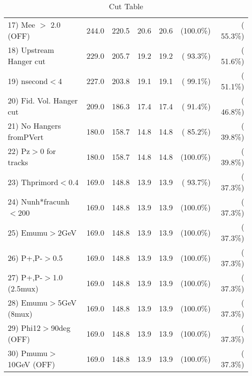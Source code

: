 \begin{table}[h!]
\begin{tabular}{||l||r|r|r|r|r|r||}
 17) Mee $>$ 2.0  (OFF)   &        244.0 &        220.5 &         20.6 &         20.6 & (100.0\%) & ( 55.3\%) \\
 18) Upstream Hanger cut  &        229.0 &        205.7 &         19.2 &         19.2 & ( 93.3\%) & ( 51.6\%) \\
 19) nsecond$<$4          &        227.0 &        203.8 &         19.1 &         19.1 & ( 99.1\%) & ( 51.1\%) \\
 20) Fid. Vol. Hanger cut &        209.0 &        186.3 &         17.4 &         17.4 & ( 91.4\%) & ( 46.8\%) \\
 21) No Hangers fromPVert &        180.0 &        158.7 &         14.8 &         14.8 & ( 85.2\%) & ( 39.8\%) \\
 22) Pz$>$0 for tracks    &        180.0 &        158.7 &         14.8 &         14.8 & (100.0\%) & ( 39.8\%) \\
 23) Thprimord$<$0.4      &        169.0 &        148.8 &         13.9 &         13.9 & ( 93.7\%) & ( 37.3\%) \\
 24) Nunh*fracunh$<$200   &        169.0 &        148.8 &         13.9 &         13.9 & (100.0\%) & ( 37.3\%) \\
 25) Emumu$>$2GeV         &        169.0 &        148.8 &         13.9 &         13.9 & (100.0\%) & ( 37.3\%) \\
 26) P+,P-$>$0.5          &        169.0 &        148.8 &         13.9 &         13.9 & (100.0\%) & ( 37.3\%) \\
 27) P+,P-$>$1.0 (2.5mux) &        169.0 &        148.8 &         13.9 &         13.9 & (100.0\%) & ( 37.3\%) \\
 28) Emumu$>$5GeV  (8mux) &        169.0 &        148.8 &         13.9 &         13.9 & (100.0\%) & ( 37.3\%) \\
 29) Phi12$>$90deg  (OFF) &        169.0 &        148.8 &         13.9 &         13.9 & (100.0\%) & ( 37.3\%) \\
 30) Pmumu$>$10GeV  (OFF) &        169.0 &        148.8 &         13.9 &         13.9 & (100.0\%) & ( 37.3\%) \\
 \hline
 \hline
 \end{tabular}
 \caption{Cut Table           }
 \label{tab-cutcohjpsi-mumu_anumucc}
 \end{table}
